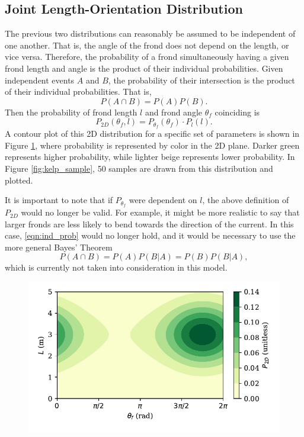 \documentclass[ms,cpyr,lof,lot]{uathesis}
\begin{document}
\subsection{Joint Length-Orientation Distribution}
\label{sec:dist_2d}
The previous two distributions can reasonably be assumed to be independent of one another. That is, the angle of the frond does not depend on the length, or vice versa.
Therefore, the probability of a frond simultaneously having a given frond length and angle is the product of their individual probabilities.
Given independent events $A$ and $B$, the probability of their intersection is the product of their individual probabilities.
That is,
\begin{equation*}
	\label{eqn:ind_prob}
	P(A \cap B) = P(A)P(B).
\end{equation*}
Then the probability of frond length $l$ and frond angle $\theta_f$ coinciding is
\begin{equation}
  \label{eqn:p2d}
	P_{2D}(\theta_f,l) = P_{\theta_f}(\theta_f) \cdot P_l(l).
\end{equation}
A contour plot of this 2D distribution for a specific set of parameters is shown in Figure \ref{fig:dist_2d}, where probability is represented by color in the 2D plane.
Darker green represents higher probability, while lighter beige represents lower probability.
In Figure \ref{fig:kelp_sample}, 50 samples are drawn from this distribution and plotted.

It is important to note that if $P_{\theta_f}$ were dependent on $l$, the above definition of $P_{2D}$ would no longer be valid.
For example, it might be more realistic to say that larger fronds are less likely to bend towards the direction of the current.
In this case, \eqref{eqn:ind_prob} would no longer hold, and it would be necessary to use the more general Bayes' Theorem
\begin{equation*}
	P(A \cap B) = P(A)P(B|A) = P(B)P(B|A),
\end{equation*}
which is currently not taken into consideration in this model.

\begin{figure}[h]
	\centering
	\includegraphics[width=4.5in]{prob_2d}
	\label{fig:dist_2d}
\end{figure}
\end{document}
